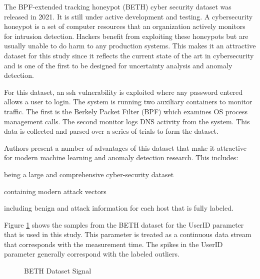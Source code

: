 The BPF-extended tracking honeypot (BETH) cyber security dataset \parencite{beth-dataset} was released in 2021.
It is still under active development and testing.
A cybersecurity honeypot is a set of computer resources that an organization actively monitors for intrusion detection.
Hackers benefit from exploiting these honeypots but are usually unable to do harm to any production systems.
This makes it an attractive dataset for this study since it reflects the current state of the art in cybersecurity and is one of the first to be designed for uncertainty analysis and anomaly detection.

For this dataset, an ssh vulnerability is exploited where any password entered allows a user to login.
The system is running two auxiliary containers to monitor traffic.
The first is the Berkely Packet Filter (BPF) which examines OS process management calls.
The second monitor logs DNS activity from the system.
This data is collected and parsed over a series of trials to form the dataset.

Authors \cite{beth-dataset} present a number of advantages of this dataset that make it attractive for modern machine learning and anomaly detection research.
This includes:
\begin{inlinelist}
    \item being a large and comprehensive cyber-security dataset
    \item containing modern attack vectors
    \item including benign and attack information for each host that is fully labeled.
\end{inlinelist}

Figure \ref{fig:beth_userid_all} shows the samples from the BETH dataset for the UserID parameter that is used in this study.
This parameter is treated as a continuous data stream that corresponds with the measurement time.
The spikes in the UserID parameter generally correspond with the labeled outliers.

\begin{figure}[H]
    
    \caption{BETH Dataset Signal}
    \label{fig:beth_userid_all}
\end{figure}

